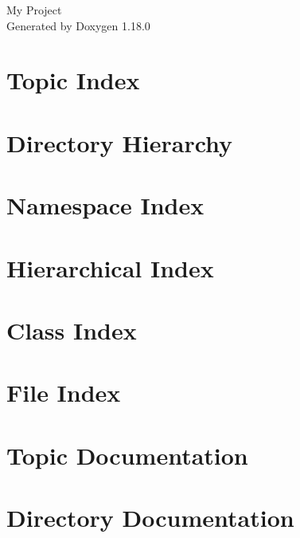 \documentclass[twoside]{book}
\newcommand{\+}{\discretionary{\mbox{\scriptsize$\hookleftarrow$}}{}{}}
\newcommand{\clearemptydoublepage}{%
    \newpage{\pagestyle{empty}\cleardoublepage}%
  }
\begin{document}
  \raggedbottom
    \hypersetup{pageanchor=false,
                bookmarksnumbered=true,
                pdfencoding=unicode
               }
  \begin{titlepage}
  \vspace*{7cm}
  \begin{center}%
  {\Large My Project}\\
  \vspace*{1cm}
  {\large Generated by Doxygen 1.18.0}\\
  \end{center}
  \end{titlepage}
  \clearemptydoublepage
  \tableofcontents
  \clearemptydoublepage
  \hypersetup{pageanchor=true}
\chapter{Topic Index}

\chapter{Directory Hierarchy}

\chapter{Namespace Index}

\chapter{Hierarchical Index}

\chapter{Class Index}

\chapter{File Index}

\chapter{Topic Documentation}

\chapter{Directory Documentation}

\end{document}
